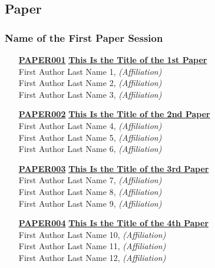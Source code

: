 
\subsection{Paper}
\subsubsection{Name of the First Paper Session}
\begin{enumerate}
\item[\href{https://doi.org/10.1145/1122445.1122456}{\textbf{PAPER001}}]
\href{https://doi.org/10.1145/1122445.1122456}{\textbf{This Is the Title of the 1st Paper}}\\
First Author Last Name 1, \emph{(Affiliation)}\\
First Author Last Name 2, \emph{(Affiliation)}\\
First Author Last Name 3, \emph{(Affiliation)}\\

\item[\href{https://doi.org/10.1145/1122445.1122456}{\textbf{PAPER002}}]
\href{https://doi.org/10.1145/1122445.1122456}{\textbf{This Is the Title of the 2nd Paper}}\\
First Author Last Name 4, \emph{(Affiliation)}\\
First Author Last Name 5, \emph{(Affiliation)}\\
First Author Last Name 6, \emph{(Affiliation)}\\

\item[\href{https://doi.org/10.1145/1122445.1122456}{\textbf{PAPER003}}]
\href{https://doi.org/10.1145/1122445.1122456}{\textbf{This Is the Title of the 3rd Paper}}\\
First Author Last Name 7, \emph{(Affiliation)}\\
First Author Last Name 8, \emph{(Affiliation)}\\
First Author Last Name 9, \emph{(Affiliation)}\\

\item[\href{https://doi.org/10.1145/1122445.1122456}{\textbf{PAPER004}}]
\href{https://doi.org/10.1145/1122445.1122456}{\textbf{This Is the Title of the 4th Paper}}\\
First Author Last Name 10, \emph{(Affiliation)}\\
First Author Last Name 11, \emph{(Affiliation)}\\
First Author Last Name 12, \emph{(Affiliation)}\\
\end{enumerate}

